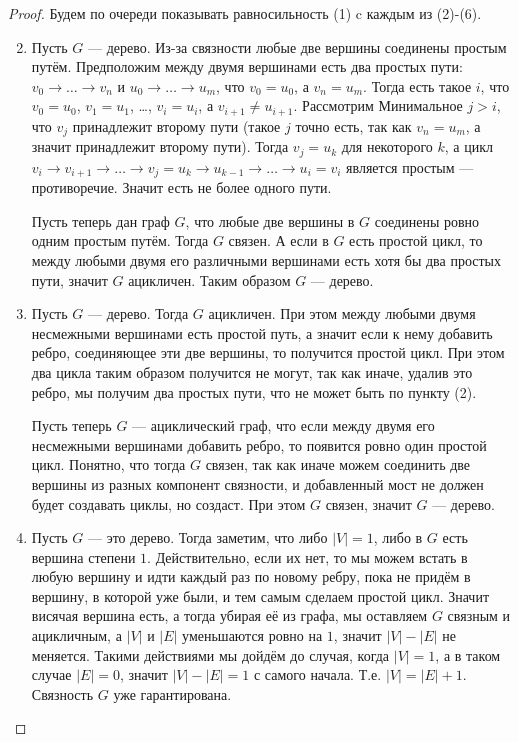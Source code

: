 \documentclass[12pt,a4paper]{article}
\begin{document}
    \begin{proof}
        Будем по очереди показывать равносильность (1) c каждым из (2)-(6).
        \begin{enumerate}
            \setcounter{enumi}{1}
            \renewcommand{\labelenumi}{(\theenumi)}
            \item Пусть $G$ --- дерево. Из-за связности любые две вершины соединены простым путём. Предположим между двумя вершинами есть два простых пути: $v_0 \to \dots \to v_n$ и $u_0 \to \dots \to u_m$, что $v_0 = u_0$, а $v_n = u_m$. Тогда есть такое $i$, что $v_0 = u_0$, $v_1 = u_1$, \dots , $v_i = u_i$, а $v_{i+1} \neq u_{i+1}$. Рассмотрим Минимальное $j > i$, что $v_j$ принадлежит второму пути (такое $j$ точно есть, так как $v_n = u_m$, а значит принадлежит второму пути). Тогда $v_j = u_k$ для некоторого $k$, а цикл $v_i \to v_{i+1} \to \dots \to v_j = u_k \to u_{k-1} \to \dots \to u_i = v_i$ является простым --- противоречие. Значит есть не более одного пути.
            
            Пусть теперь дан граф $G$, что любые две вершины в $G$ соединены ровно одним простым путём. Тогда $G$ связен. А если в $G$ есть простой цикл, то между любыми двумя его различными вершинами есть хотя бы два простых пути, значит $G$ ацикличен. Таким образом $G$ --- дерево.

            \item Пусть $G$ --- дерево. Тогда $G$ ацикличен. При этом между любыми двумя несмежными вершинами есть простой путь, а значит если к нему добавить ребро, соединяющее эти две вершины, то получится простой цикл. При этом два цикла таким образом получится не могут, так как иначе, удалив это ребро, мы получим два простых пути, что не может быть по пункту (2).
            
            Пусть теперь $G$ --- ациклический граф, что если между двумя его несмежными вершинами добавить ребро, то появится ровно один простой цикл. Понятно, что тогда $G$ связен, так как иначе можем соединить две вершины из разных компонент связности, и добавленный мост не должен будет создавать циклы, но создаст. При этом $G$ связен, значит $G$ --- дерево.

            \item Пусть $G$ --- это дерево. Тогда заметим, что либо $|V| = 1$, либо в $G$ есть вершина степени $1$. Действительно, если их нет, то мы можем встать в любую вершину и идти каждый раз по новому ребру, пока не придём в вершину, в которой уже были, и тем самым сделаем простой цикл. Значит висячая вершина есть, а тогда убирая её из графа, мы оставляем $G$ связным и ацикличным, а $|V|$ и $|E|$ уменьшаются ровно на $1$, значит $|V| - |E|$ не меняется. Такими действиями мы дойдём до случая, когда $|V| = 1$, а в таком случае $|E| = 0$, значит $|V| - |E| = 1$ с самого начала. Т.е. $|V| = |E| + 1$. Связность $G$ уже гарантирована.
            

\end{enumerate}
\end{proof}
\end{document}
